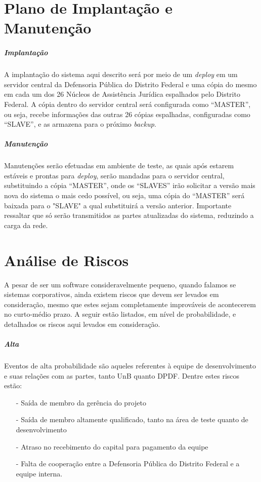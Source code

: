 \documentclass[12pt,a4paper]{report}
\begin{document}
\chapter{Plano de Implantação e Manutenção}
\paragraph{Implantação} A implantação do sistema aqui descrito será por meio de um \textit{deploy} em um servidor central da Defensoria Pública do Distrito Federal e uma cópia do mesmo em cada um dos 26 Núcleos de Assistência Jurídica espalhados pelo Distrito Federal. A cópia dentro do servidor central será configurada como ``MASTER'', ou seja, recebe informações das outras 26 cópias espalhadas, configuradas como ``SLAVE'', e as armazena para o próximo \textit{backup}.

\paragraph{Manutenção} Manutenções serão efetuadas em ambiente de teste, as quais após estarem estáveis e prontas para \textit{deploy}, serão mandadas para o servidor central, substituindo a cópia ``MASTER'', onde os ``SLAVES'' irão solicitar a versão mais nova do sistema o mais cedo possível, ou seja, uma cópia do ``MASTER'' será baixada para o "SLAVE" a qual substituirá a versão anterior. Importante ressaltar que só serão transmitidos as partes atualizadas do sistema, reduzindo a carga da rede.

\chapter{Análise de Riscos}

A pesar de ser um software consideravelmente pequeno, quando falamos se sistemas corporativos, ainda existem riscos que devem ser levados em consideração, mesmo que estes sejam completamente improváveis de acontecerem no curto-médio prazo. A seguir estão listados, em nível de probabilidade, e detalhados os riscos aqui levados em consideração.

\paragraph{Alta} Eventos de alta probabilidade são aqueles referentes à equipe de desenvolvimento e suas relações com as partes, tanto UnB quanto DPDF. Dentre estes riscos estão:

\begin{itemize}
\item [-] Saída de membro da gerência do projeto
\item [-] Saída de membro altamente qualificado, tanto na área de teste quanto de desenvolvimento
\item [-] Atraso no recebimento do capital para pagamento da equipe
\item [-] Falta de cooperação entre a Defensoria Pública do Distrito Federal e a equipe interna.
\end{itemize}
\end{document}
